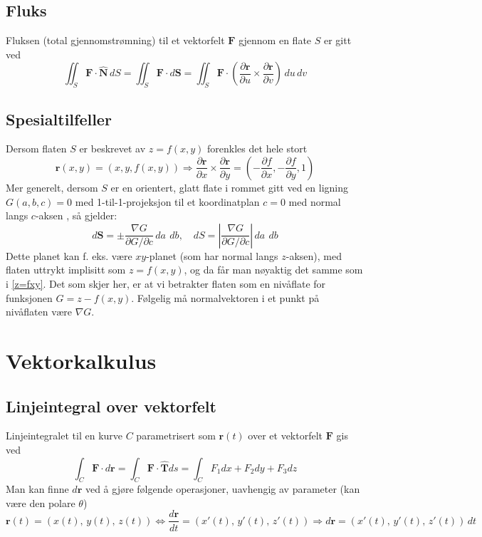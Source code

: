 \documentclass[fleqn,12pt]{wlscirep}
\begin{document}
\subsection{Fluks}
Fluksen (total gjennomstrømning) til et vektorfelt $\textbf{F}$ gjennom en flate $S$ er gitt ved
\begin{equation}
    \iint_S \textbf{F}\cdot\hat{\textbf{N}}\, dS = \iint_S \textbf{F}\cdot d\textbf{S} = \iint_S \textbf{F} \cdot \left(\frac{\partial \textbf{r}}{\partial u}\times \frac{\partial \textbf{r}}{\partial v}\right) \,du\,dv
\end{equation}
\subsection{Spesialtilfeller}
Dersom flaten $S$ er beskrevet av $z = f(x,y)$ forenkles det hele stort
\begin{equation}
    \textbf{r}(x,y) = (x,y,f(x,y)) \Longrightarrow \frac{\partial \textbf{r}}{\partial x}\times \frac{\partial \textbf{r}}{\partial y} = \left(-\frac{\partial f}{\partial x},-\frac{\partial f}{\partial y}, 1\right) \label{z=fxy}
\end{equation}
Mer generelt, dersom $S$ er en orientert, glatt flate i rommet gitt ved en ligning $G(a,b,c) = 0$ med 1-til-1-projeksjon til et koordinatplan $c=0$ med normal langs $c$-aksen , så gjelder:
\begin{equation}
    d\textbf{S} = \pm \frac{\nabla G}{\partial G/\partial c}\,da\, \ db, \quad dS = \left|\frac{\nabla G}{\partial G/\partial c}\right|\,da \ \,db 
\end{equation}
Dette planet kan f. eks. være $xy$-planet (som har normal langs $z$-aksen), med flaten uttrykt implisitt som $z= f(x,y)$, og da får man nøyaktig det samme som i \ref{z=fxy}. Det som skjer her, er at vi betrakter flaten som en nivåflate for funksjonen $G = z-f(x,y)$. Følgelig må normalvektoren i et punkt på nivåflaten være $\nabla G$.
\section{Vektorkalkulus}
\subsection{Linjeintegral over vektorfelt}
Linjeintegralet til en kurve $C$ parametrisert som $\textbf{r}(t)$ over et vektorfelt $\textbf{F}$ gis ved 
\begin{equation}
    \int_C \textbf{F}\cdot d\textbf{r} = \int_C \textbf{F}\cdot \hat{\textbf{T}} ds = \int_C F_1 dx + F_2 dy + F_3 dz
\end{equation}
Man kan finne $d\textbf{r}$ ved å gjøre følgende operasjoner, uavhengig av parameter (kan være den polare $\theta$) 
\begin{equation}
    \textbf{r}(t) = (x(t),\,y(t),\,z(t)) \Longleftrightarrow \frac{d\textbf{r}}{dt} = (x'(t),\,y'(t),\,z'(t)) \Longrightarrow d\textbf{r} = (x'(t),\,y'(t),\,z'(t)) \, dt
\end{equation}
\end{document}

